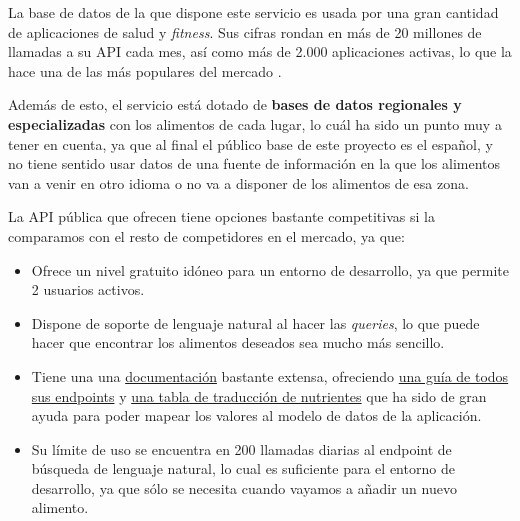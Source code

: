 La base de datos de la que dispone este servicio es usada por una gran cantidad de aplicaciones de salud y \textit{fitness}. Sus cifras rondan en más de 20 millones de llamadas a su API cada mes, así como más de 2.000 aplicaciones activas, lo que la hace una de las más populares del mercado \cite{nutritionix:api-info}.

 Además de esto, el servicio está dotado de \textbf{bases de datos regionales y especializadas} con los alimentos de cada lugar, lo cuál ha sido un punto muy a tener en cuenta, ya que al final el público base de este proyecto es el español, y no tiene sentido usar datos de una fuente de información en la que los alimentos van a venir en otro idioma o no va a disponer de los alimentos de esa zona.

La API pública que ofrecen tiene opciones bastante competitivas si la comparamos con el resto de competidores en el mercado, ya que:

\begin{itemize}
	\item Ofrece un nivel gratuito idóneo para un entorno de desarrollo, ya que permite 2 usuarios activos.
	\item Dispone de soporte de lenguaje natural al hacer las \textit{queries}, lo que puede hacer que encontrar los alimentos deseados sea mucho más sencillo.
	\item Tiene una una \href{https://developer.syndigo.com/docs/nutritionix-api-guide}{documentación} bastante extensa, ofreciendo \href{https://trackapi.nutritionix.com/docs/#/default/get_v2_search_instant}{una guía de todos sus endpoints} y \href{https://developer.syndigo.com/docs/list-of-all-nutrients-and-nutrient-ids-from-api}{una tabla de traducción de nutrientes} que ha sido de gran ayuda para poder mapear los valores al modelo de datos de la aplicación.
	\item Su límite de uso se encuentra en 200 llamadas diarias al endpoint de búsqueda de lenguaje natural, lo cual es suficiente para el entorno de desarrollo, ya que sólo se necesita cuando vayamos a añadir un nuevo alimento.
\end{itemize}